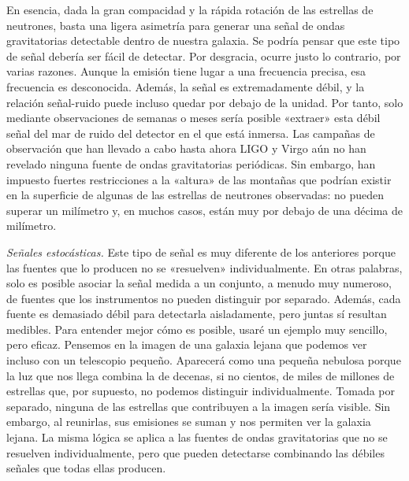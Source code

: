 En esencia, dada la gran compacidad y la rápida rotación de las estrellas de neutrones, basta una ligera asimetría para generar una señal de ondas gravitatorias detectable dentro de nuestra galaxia. Se podría pensar que este tipo de señal debería ser fácil de detectar. Por desgracia, ocurre justo lo contrario, por varias razones. Aunque la emisión tiene lugar a una frecuencia precisa, esa frecuencia es desconocida. Además, la señal es extremadamente débil, y la relación señal-ruido puede incluso quedar por debajo de la unidad. Por tanto, solo mediante observaciones de semanas o meses sería posible «extraer» esta débil señal del mar de ruido del detector en el que está inmersa. Las campañas de observación que han llevado a cabo hasta ahora LIGO y Virgo aún no han revelado ninguna fuente de ondas gravitatorias periódicas. Sin embargo, han impuesto fuertes restricciones a la «altura» de las montañas que podrían existir en la superficie de algunas de las estrellas de neutrones observadas: no pueden superar un milímetro y, en muchos casos, están muy por debajo de una décima de milímetro.

\emph{Señales estocásticas.} Este tipo de señal es muy diferente de los anteriores porque las fuentes que lo producen no se «resuelven» individualmente. En otras palabras, solo es posible asociar la señal medida a un conjunto, a menudo muy numeroso, de fuentes que los instrumentos no pueden distinguir por separado. Además, cada fuente es demasiado débil para detectarla aisladamente, pero juntas sí resultan medibles. Para entender mejor cómo es posible, usaré un ejemplo muy sencillo, pero eficaz. Pensemos en la imagen de una galaxia lejana que podemos ver incluso con un telescopio pequeño. Aparecerá como una pequeña nebulosa porque la luz que nos llega combina la de decenas, si no cientos, de miles de millones de estrellas que, por supuesto, no podemos distinguir individualmente. Tomada por separado, ninguna de las estrellas que contribuyen a la imagen sería visible. Sin embargo, al reunirlas, sus emisiones se suman y nos permiten ver la galaxia lejana. La misma lógica se aplica a las fuentes de ondas gravitatorias que no se resuelven individualmente, pero que pueden detectarse combinando las débiles señales que todas ellas producen.

